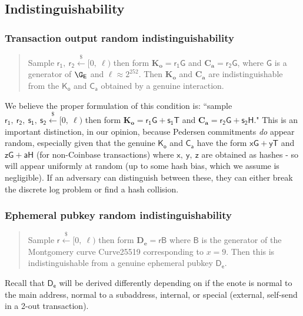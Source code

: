 \documentclass{article}
\theoremstyle{definition}
\newcommand{\6}{\mathbf}
\newcommand{\7}{\mathcal}
\renewcommand{\sf}[1]{{\mathsf{#1}}}
\newcommand{\sfb}[1]{{\mathsf{\mathbf{#1}}}}
\begin{document}
\subsection{Indistinguishability}


\subsubsection{Transaction output random indistinguishability} \label{TORI} 

\begin{quote}
        Sample $\sf{r_1, \ r_2} \xleftarrow{\$} [0, \ \ell)$ then form $\sfb{K_o} = \sf{r_1 G}$ and $\sfb{C_a} = \sf{r_2 G}$, where $\sf{G}$ is a generator of $\G_\sf{E}$ and $\ell \approx 2^{252}$. Then $\sfb{K_o}$ and $\sfb{C_a}$ are indistinguishable from the $\sf{K_o}$ and $\sf{C_a}$ obtained by a genuine interaction.
\end{quote}


We believe the proper formulation of this condition is: ``sample $\sf{r_1, \ r_2, \ s_1, \ s_2} \xleftarrow{\$} [0, \ \ell)$ then form $\sfb{K_o} = \sf{r_1 G + s_1 T}$ and $\sfb{C_a} = \sf{r_2 G + s_2 H}$." This is an important distinction, in our opinion, because Pedersen commitments \textit{do} appear random, especially given that the genuine $\sf{K_o}$ and $\sf{C_a}$ have the form $\sf{xG + yT}$ and $\sf{zG + aH}$ (for non-Coinbase transactions) where $\sf{x, \ y, \ z}$ are obtained as hashes - so will appear uniformly at random (up to some hash bias, which we assume is negligible). If an adversary can distinguish between these, they can either break the discrete log problem or find a hash collision.
\medskip










\subsubsection{Ephemeral pubkey random indistinguishability} 

\begin{quote}
        Sample $\sf{r} \xleftarrow{\$} [0, \ \ell)$ then form $\sfb{D_e} = \sf{rB}$ where $\sf{B}$ is the generator of the Montgomery curve Curve25519 corresponding to $x=9$. Then this is indistinguishable from a genuine ephemeral pubkey $\sf{D_e}$.
\end{quote}


Recall that $\sf{D_e}$ will be derived differently depending on if the enote is normal to the main address, normal to a subaddress, internal, or special (external, self-send in a 2-out transaction). 
\end{document}
